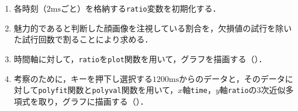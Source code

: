 \begin{enumerate}
\begin{enumerate}
              \item 最終的に魅力的であると判断した顔画像を注視している場合は\texttt{1}，そうでない場合は\texttt{0}を\expos の4列目に代入する．この処理は，画面状態が\texttt{0}と欠損値に対しては行わない．
              \item {}で初期化済みの\texttt{mergeC}行列に対して，に\expos の\(1\)から\(500\)行目（判断前1秒間）のデータを格納する．
          \end{enumerate}
    \item 各時刻（\(2\textrm{ms}\)ごと）を格納する\texttt{ratio}変数を初期化する．
    \item 魅力的であると判断した顔画像を注視している割合を，欠損値の試行を除いた試行回数で割ることにより求める．
    \item 時間軸に対して，\texttt{ratio}を\texttt{plot}関数を用いて，グラフを描画する（）．
    \item 考察のために，キーを押下し選択する\(1200\textrm{ms}\)からのデータと，そのデータに対して\texttt{polyfit}関数と\texttt{polyval}関数を用いて，\(x\)軸\texttt{time}，\(y\)軸\texttt{ratio}の3次近似多項式を取り，グラフに描画する（）．
\end{enumerate}
